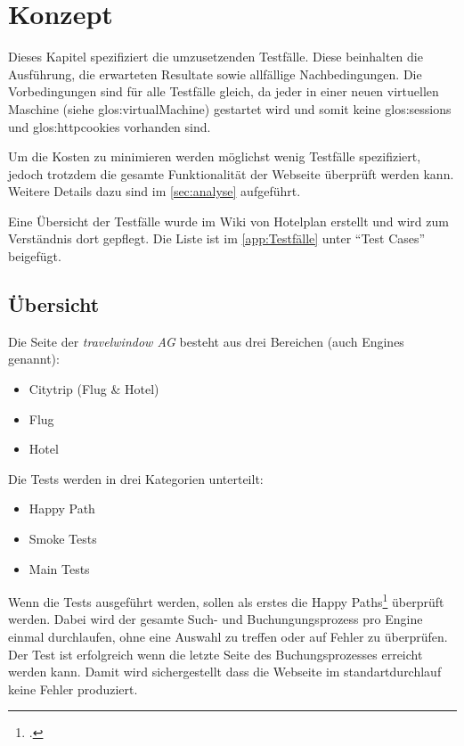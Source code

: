 
\chapter{Konzept}
\label{sec:konzept}
Dieses Kapitel spezifiziert die umzusetzenden Testfälle. Diese beinhalten die Ausführung, die erwarteten Resultate sowie allfällige Nachbedingungen. Die Vorbedingungen sind für alle Testfälle gleich, da jeder in einer neuen virtuellen Maschine (siehe \Gls{glos:virtualMachine}) gestartet wird und somit keine \Glspl{glos:session} und \Glspl{glos:httpcookie} vorhanden sind.

Um die Kosten zu minimieren werden möglichst wenig Testfälle spezifiziert, jedoch trotzdem die gesamte Funktionalität der Webseite überprüft werden kann. Weitere Details dazu sind im \cref{sec:analyse}  aufgeführt.

Eine Übersicht der Testfälle wurde im Wiki von Hotelplan erstellt und wird zum Verständnis dort gepflegt. Die Liste ist im \cref{app:Testfälle}  unter "`Test Cases"' beigefügt.

\section{Übersicht}
Die Seite der \textit{travelwindow AG} besteht aus drei Bereichen (auch Engines genannt):
\begin{itemize}
\item Citytrip (Flug \& Hotel)
\item Flug
\item Hotel
\end{itemize}

Die Tests werden in drei Kategorien unterteilt:
\begin{itemize}
\item Happy Path
\item Smoke Tests
\item Main Tests
\end{itemize}

Wenn die Tests ausgeführt werden, sollen als erstes die Happy Paths\footcite{Happy_path_-_Wikipedia_the_free_encyclopedia_2015-07-30} überprüft werden. Dabei wird der gesamte Such- und Buchungungsprozess pro Engine einmal durchlaufen, ohne eine Auswahl zu treffen oder auf Fehler zu überprüfen. Der Test ist erfolgreich wenn die letzte Seite des Buchungsprozesses erreicht werden kann. Damit wird sichergestellt dass die Webseite im standartdurchlauf keine Fehler produziert.

